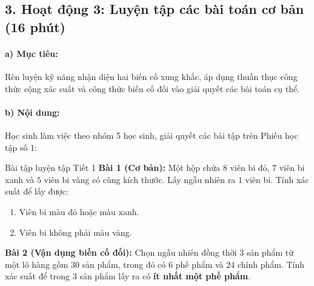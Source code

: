 \documentclass[12pt, a4paper]{article}
\begin{document}
\subsection*{3. Hoạt động 3: Luyện tập các bài toán cơ bản (16 phút)}

\paragraph{a) Mục tiêu:} Rèn luyện kỹ năng nhận diện hai biến cố xung khắc, áp dụng thuần thục công thức cộng xác suất và công thức biến cố đối vào giải quyết các bài toán cụ thể.

\paragraph{b) Nội dung:} Học sinh làm việc theo nhóm 5 học sinh, giải quyết các bài tập trên Phiếu học tập số 1:

\begin{pedabox}{Bài tập luyện tập Tiết 1}
\textbf{Bài 1 (Cơ bản):} Một hộp chứa $8$ viên bi đỏ, $7$ viên bi xanh và $5$ viên bi vàng có cùng kích thước. Lấy ngẫu nhiên ra $1$ viên bi. Tính xác suất để lấy được:
\begin{enumerate}[leftmargin=0.6cm]
    \item[a)] Viên bi màu đỏ hoặc màu xanh.
    \item[b)] Viên bi không phải màu vàng.
\end{enumerate}

\textbf{Bài 2 (Vận dụng biến cố đối):} Chọn ngẫu nhiên đồng thời $3$ sản phẩm từ một lô hàng gồm $30$ sản phẩm, trong đó có $6$ phế phẩm và $24$ chính phẩm. Tính xác suất để trong $3$ sản phẩm lấy ra có \textbf{ít nhất một phế phẩm}.
\end{pedabox}
\end{document}

